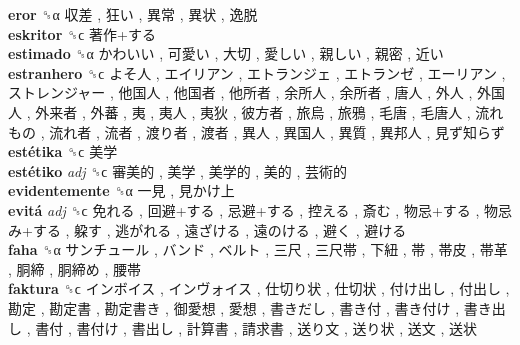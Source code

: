 \textbf{eror} ␝α   収差 ,  狂い ,  異常 ,  異状 ,  逸脱   \\
\textbf{eskritor} ␝ϲ   著作+する   \\
\textbf{estimado} ␝α   かわいい ,  可愛い ,  大切 ,  愛しい ,  親しい ,  親密 ,  近い   \\
\textbf{estranhero} ␝ϲ   よそ人 ,  エイリアン ,  エトランジェ ,  エトランゼ ,  エーリアン ,  ストレンジャー ,  他国人 ,  他国者 ,  他所者 ,  余所人 ,  余所者 ,  唐人 ,  外人 ,  外国人 ,  外来者 ,  外蕃 ,  夷 ,  夷人 ,  夷狄 ,  彼方者 ,  旅烏 ,  旅鴉 ,  毛唐 ,  毛唐人 ,  流れもの ,  流れ者 ,  流者 ,  渡り者 ,  渡者 ,  異人 ,  異国人 ,  異質 ,  異邦人 ,  見ず知らず   \\
\textbf{estétika} ␝ϲ   美学   \\
\textbf{estétiko} \emph{adj}  ␝ϲ   審美的 ,  美学 ,  美学的 ,  美的 ,  芸術的   \\
\textbf{evidentemente} ␝α   一見 ,  見かけ上   \\
\textbf{evitá} \emph{adj}  ␝ϲ   免れる ,  回避+する ,  忌避+する ,  控える ,  斎む ,  物忌+する ,  物忌み+する ,  躱す ,  逃がれる ,  遠ざける ,  遠のける ,  避く ,  避ける   \\
\textbf{faha} ␝α   サンチュール ,  バンド ,  ベルト ,  三尺 ,  三尺帯 ,  下紐 ,  帯 ,  帯皮 ,  帯革 ,  胴締 ,  胴締め ,  腰帯   \\
\textbf{faktura} ␝ϲ   インボイス ,  インヴォイス ,  仕切り状 ,  仕切状 ,  付け出し ,  付出し ,  勘定 ,  勘定書 ,  勘定書き ,  御愛想 ,  愛想 ,  書きだし ,  書き付 ,  書き付け ,  書き出し ,  書付 ,  書付け ,  書出し ,  計算書 ,  請求書 ,  送り文 ,  送り状 ,  送文 ,  送状   \\
